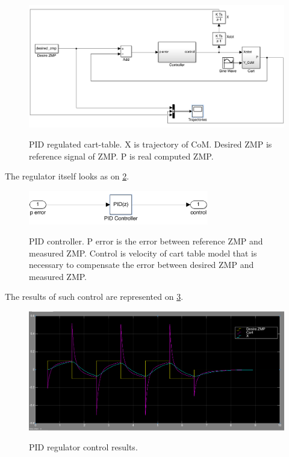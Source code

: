 \documentclass[12pt,a4paper]{report}
\begin{document}
		\begin{figure}[h!]
			\vspace{-0.2cm}
			\centering
			{\includegraphics[width=1\textwidth]{15}}
			\caption{PID regulated cart-table. X is trajectory of CoM. Desired ZMP is reference signal of ZMP. P is real computed ZMP.}
			\label{fig:15}
			\vspace{-0.1cm}
		\end{figure}
		
		The regulator itself looks as on \cref{fig:16}.
		
		\begin{figure}[h!]
			\vspace{-0.2cm}
			\centering
			{\includegraphics[width=0.7\textwidth]{16}}
			\caption{PID controller. P error is the error between reference ZMP and measured ZMP. Control is velocity of cart table model that is necessary to compensate the error between desired ZMP and measured ZMP.}
			\label{fig:16}
			\vspace{-0.1cm}
		\end{figure}
		
		The results of such control are represented on \cref{fig:17}.
		
		\begin{figure}[h!]
			\vspace{-0.2cm}
			\centering
			{\includegraphics[width=1\textwidth]{17}}
			\caption{PID regulator control results.}
			\label{fig:17}
			\vspace{-0.1cm}
		\end{figure}
		
\end{document}
